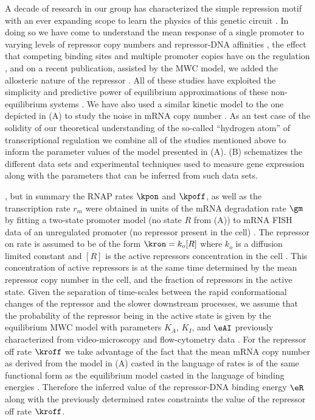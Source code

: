 A decade of research in our group has characterized the simple repression motif
with an ever expanding scope to learn the physics of this genetic circuit
. In doing so we have come to understand the mean
response of a single promoter to varying levels of repressor copy numbers and
repressor-DNA affinities \cite{Garcia2011c}, the effect that competing binding
sites and multiple promoter copies have on the regulation \cite{Brewster2014},
and on a recent publication, assisted by the MWC model, we added the allosteric
nature of the repressor \cite{Razo-Mejia2018}. All of these studies have
exploited the simplicity and predictive power of equilibrium approximations of
these non-equilibrium systems \cite{Buchler2003}. We have also used a similar
kinetic model to the one depicted in (A) to study the
noise in mRNA copy number \cite{Jones2014a}. As an test case of the solidity of
our theoretical understanding of the so-called ``hydrogen atom'' of
transcriptional regulation we combine all of the studies mentioned above to
inform the parameter values of the model presented in
(A). (B) schematizes the
different data sets and experimental techniques used to measure gene expression
along with the parameters that can be inferred from such data sets.

, but in summary the RNAP rates $\kpon$ and $\kpoff$, as
well as the transcription rate $r_m$ were obtained in units of the mRNA
degradation rate $\gm$ by fitting a two-state promoter model \cite{Peccoud1995}
(no state $R$ from (A)) to mRNA FISH data of an
unregulated promoter (no  repressor present in the cell) \cite{Jones2014a}. The
repressor on rate is assumed to be of the form $\kron = k_o [R]$ where $k_o$ is
a diffusion limited constant and $[R]$ is the active repressors concentration in
the cell \cite{Jones2014a}. This concentration of active repressors is at the
same time determined by the mean repressor copy number in the cell, and the
fraction of repressors in the active state. Given the separation of time-scales
between the rapid conformational changes of the repressor and the slower
downstream processes, we assume that the probability of the repressor being in
the active state is given by the equilibrium MWC model with parameters $K_A$,
$K_I$, and $\eAI$ previously characterized from video-microscopy and
flow-cytometry data \cite{Razo-Mejia2018}. For the repressor off rate $\kroff$
we take advantage of the fact that the mean mRNA copy number as derived from the
model in (A) casted in the language of rates is of the
same functional form as the equilibrium model casted in the language of binding
energies \cite{Phillips2015}. Therefore the inferred value of the repressor-DNA
binding energy $\eR$ along with the previously determined rates constraints the
value of the repressor off rate $\kroff$.


